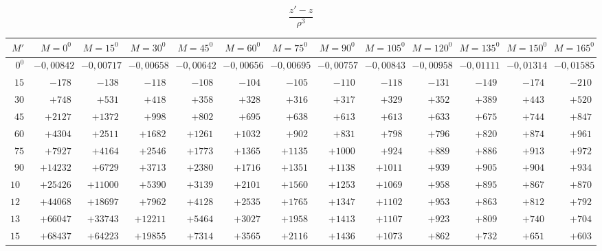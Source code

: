 \clearpage
\begin{landscape}
\begingroup
\scriptsize
\setlength{\tabcolsep}{2pt}
\renewcommand{\arraystretch}{1.12}
\[\frac{z'-z}{\rho^3}\]
\begin{center}
\begin{tabular}{@{}r|*{11}{r|}r@{}}
\hline
\(M'\) & \(M=0^0\) & \(M=15^0\) & \(M=30^0\) & \(M=45^0\) & \(M=60^0\) & \(M=75^0\) & \(M=90^0\) & \(M=105^0\) & \(M=120^0\) & \(M=135^0\) & \(M=150^0\) & \(M=165^0\)\\
\hline
\(0^0\) & \(-0{,}00842\) & \(-0{,}00717\) & \(-0{,}00658\) & \(-0{,}00642\) & \(-0{,}00656\) & \(-0{,}00695\) & \(-0{,}00757\) & \(-0{,}00843\) & \(-0{,}00958\) & \(-0{,}01111\) & \(-0{,}01314\) & \(-0{,}01585\)\\
\(15\) & \(-178\) & \(-138\) & \(-118\) & \(-108\) & \(-104\) & \(-105\) & \(-110\) & \(-118\) & \(-131\) & \(-149\) & \(-174\) & \(-210\)\\
\(30\) & \(+748\) & \(+531\) & \(+418\) & \(+358\) & \(+328\) & \(+316\) & \(+317\) & \(+329\) & \(+352\) & \(+389\) & \(+443\) & \(+520\)\\
\(45\) & \(+2127\) & \(+1372\) & \(+998\) & \(+802\) & \(+695\) & \(+638\) & \(+613\) & \(+613\) & \(+633\) & \(+675\) & \(+744\) & \(+847\)\\
\(60\) & \(+4304\) & \(+2511\) & \(+1682\) & \(+1261\) & \(+1032\) & \(+902\) & \(+831\) & \(+798\) & \(+796\) & \(+820\) & \(+874\) & \(+961\)\\
\(75\) & \(+7927\) & \(+4164\) & \(+2546\) & \(+1773\) & \(+1365\) & \(+1135\) & \(+1000\) & \(+924\) & \(+889\) & \(+886\) & \(+913\) & \(+972\)\\
\(90\) & \(+14232\) & \(+6729\) & \(+3713\) & \(+2380\) & \(+1716\) & \(+1351\) & \(+1138\) & \(+1011\) & \(+939\) & \(+905\) & \(+904\) & \(+934\)\\
\(105\) & \(+25426\) & \(+11000\) & \(+5390\) & \(+3139\) & \(+2101\) & \(+1560\) & \(+1253\) & \(+1069\) & \(+958\) & \(+895\) & \(+867\) & \(+870\)\\
\(120\) & \(+44068\) & \(+18697\) & \(+7962\) & \(+4128\) & \(+2535\) & \(+1765\) & \(+1347\) & \(+1102\) & \(+953\) & \(+863\) & \(+812\) & \(+792\)\\
\(135\) & \(+66047\) & \(+33743\) & \(+12211\) & \(+5464\) & \(+3027\) & \(+1958\) & \(+1413\) & \(+1107\) & \(+923\) & \(+809\) & \(+740\) & \(+704\)\\
\(150\) & \(+68437\) & \(+64223\) & \(+19855\) & \(+7314\) & \(+3565\) & \(+2116\) & \(+1436\) & \(+1073\) & \(+862\) & \(+732\) & \(+651\) & \(+603\)\\

\end{tabular}
\end{center}
\end{landscape}
